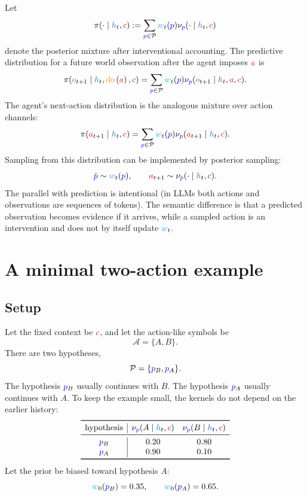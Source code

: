 \documentclass[11pt]{article}
\newcommand{\ActionSet}{\mathcal{A}}
\newcommand{\ProgramSet}{\mathcal{P}}
\newcommand{\action}{\ensuremath{\textcolor{red}{a}}}
\newcommand{\obs}{\ensuremath{\textcolor{ForestGreen}{o}}}
\newcommand{\program}{\ensuremath{\textcolor{blue}{p}}}
\newcommand{\contextsym}{\ensuremath{\textcolor{purple}{c}}}
\newcommand{\weight}{\ensuremath{\textcolor{cyan}{w}}}
\newcommand{\history}{\ensuremath{\textcolor{RoyalBlue}{h}}}
\newcommand{\policy}{\ensuremath{\pi}}
\newcommand{\kernel}{\ensuremath{\nu}}
\newcommand{\doop}{\operatorname{\textcolor{orange}{do}}}
\newcommand{\intervene}[1]{\ensuremath{\doop \left(#1\right)}}
\newcommand{\trueprog}{\ensuremath{\program_B}}
\newcommand{\trapprog}{\ensuremath{\program_A}}
\begin{document}
Let
\[
  \policy(\cdot\mid \history_t,\contextsym)
  :=
  \sum_{\program\in\ProgramSet} \weight_t(\program)\kernel_{\program}(\cdot\mid \history_t,\contextsym)
\]
denote the posterior mixture after interventional accounting. The predictive
distribution for a future world observation after the agent imposes $\action$ is
\[
  \policy(\obs_{t+1}\mid \history_t,\intervene{\action},\contextsym)
  =
  \sum_{\program\in\ProgramSet}\weight_t(\program)\kernel_{\program}(\obs_{t+1}\mid \history_t,\action,\contextsym).
\]
The agent's next-action distribution is the analogous mixture over action
channels:
\[
  \policy(\action_{t+1}\mid \history_t,\contextsym)
  =
  \sum_{\program\in\ProgramSet}\weight_t(\program)\kernel_{\program}(\action_{t+1}\mid \history_t,\contextsym).
\]
Sampling from this distribution can be implemented by posterior sampling:
\[
  \bar{\program}\sim \weight_t(\program),
  \qquad
  \action_{t+1}\sim \kernel_{\bar{\program}}(\cdot\mid \history_t,\contextsym).
\]
The parallel with prediction is intentional (in LLMs both actions and observations are sequences of tokens). The semantic difference is that a
predicted observation becomes evidence if it arrives, while a sampled action is
an intervention and does not by itself update $\weight_t$.












\section{A minimal two-action example}
\label{sec:discrete}

\subsection{Setup}

Let the fixed context be \(\contextsym\), and let the action-like symbols be
\[
  \ActionSet=\{A,B\}.
\]
There are two hypotheses,
\[
  \ProgramSet=\{\trueprog,\trapprog\}.
\]
The hypothesis \(\trueprog\) usually continues with \(B\). The hypothesis
\(\trapprog\) usually continues with \(A\). To keep the example small, the
kernels do not depend on the earlier history:
\[
\begin{array}{c|cc}
\toprule
\text{hypothesis} & \kernel_{\program}(A\mid \history_t,\contextsym)
                  & \kernel_{\program}(B\mid \history_t,\contextsym) \\
\midrule
\trueprog & 0.20 & 0.80 \\
\trapprog & 0.90 & 0.10 \\
\bottomrule
\end{array}
\]
Let the prior be biased toward hypothesis $A$: 
\[
  \weight_0(\trueprog)=0.35,
  \qquad
  \weight_0(\trapprog)=0.65.
\]
\end{document}

